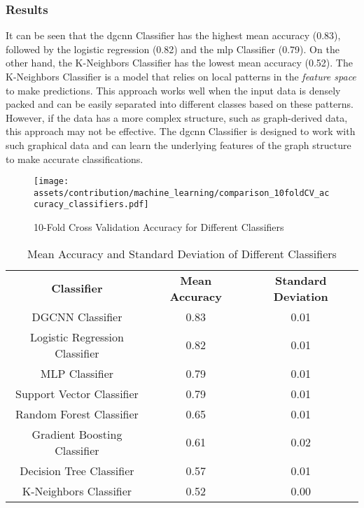 \documentclass[a4paper, 12pt]{report}
\begin{document}
\subsubsection{Results}\label{subsubsec:results-classification}

It can be seen that the \acrshort{dgcnn} Classifier has the highest mean accuracy (0.83), followed by the logistic regression (0.82) and the \acrshort{mlp} Classifier (0.79). On the other hand, the K-Neighbors Classifier has the lowest mean accuracy (0.52). The K-Neighbors Classifier is a model that relies on local patterns in the \textit{feature space} to make predictions. This approach works well when the input data is densely packed and can be easily separated into different classes based on these patterns. However, if the data has a more complex structure, such as graph-derived data, this approach may not be effective. The \acrshort{dgcnn} Classifier is designed to work with such graphical data and can learn the underlying features of the graph structure to make accurate classifications.

\begin{figure}
\centering
\texttt{[image: assets/contribution/machine\_learning/comparison\_10foldCV\_accuracy\_classifiers.pdf]}
\caption{10-Fold Cross Validation Accuracy for Different Classifiers}
\label{fig:10-fold-cross-validation-accuracy-for-different-classifiers}
\end{figure}

\begin{table}
\centering
\begin{tabular}{ ccc }
\textbf{Classifier} & \textbf{Mean Accuracy} & \textbf{Standard Deviation} \\
\rowcolor[rgb]{0.93, 0.93, 0.93} DGCNN Classifier & 0.83 & 0.01 \\
Logistic Regression Classifier & 0.82 & 0.01 \\
MLP Classifier & 0.79 & 0.01 \\
Support Vector Classifier & 0.79 & 0.01 \\
Random Forest Classifier & 0.65 & 0.01 \\
Gradient Boosting Classifier & 0.61 & 0.02 \\
Decision Tree Classifier & 0.57 & 0.01 \\
K-Neighbors Classifier & 0.52 & 0.00 \\
\end{tabular}
\caption{Mean Accuracy and Standard Deviation of Different Classifiers}
\label{tab:classifier-performance}
\end{table}
\end{document}
